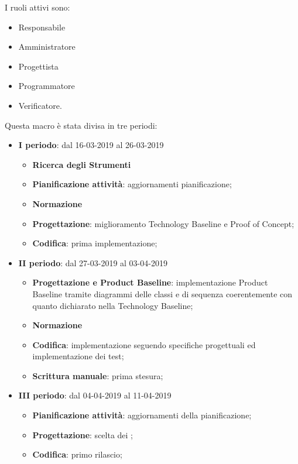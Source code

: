         I ruoli attivi sono: 
        \begin{itemize}
            \item Responsabile
            \item Amministratore
            \item Progettista
            \item Programmatore
            \item Verificatore.
        \end{itemize}
        Questa macro è stata divisa in tre periodi:
		\begin{itemize}
			\item \textbf{I periodo}: dal 16-03-2019 al 26-03-2019
			\begin{itemize}
    	        \item \textbf{Ricerca degli Strumenti}
    	        \item \textbf{Pianificazione attività}: aggiornamenti pianificazione;
    	        \item \textbf{Normazione}
    	        \item \textbf{Progettazione}: miglioramento Technology Baseline e Proof of Concept;
    	        \item \textbf{Codifica}: prima implementazione;
        	\end{itemize}
			\item \textbf{II periodo}: dal 27-03-2019 al 03-04-2019
			\begin{itemize}
				\item \textbf{Progettazione e Product Baseline}: implementazione Product Baseline tramite diagrammi delle classi e di sequenza
				coerentemente con quanto dichiarato nella Technology Baseline;
    	        \item \textbf{Normazione}
    	        \item \textbf{Codifica}: implementazione seguendo specifiche progettuali ed implementazione dei test;
    	        \item \textbf{Scrittura manuale}: prima stesura;
        	\end{itemize}
        	\item \textbf{III periodo}: dal 04-04-2019 al 11-04-2019
			\begin{itemize}
				\item \textbf{Pianificazione attività}: aggiornamenti della pianificazione;
    	        \item \textbf{Progettazione}: scelta dei ;
    	        \item \textbf{Codifica}: primo rilascio;

\end{itemize}
\end{itemize}
